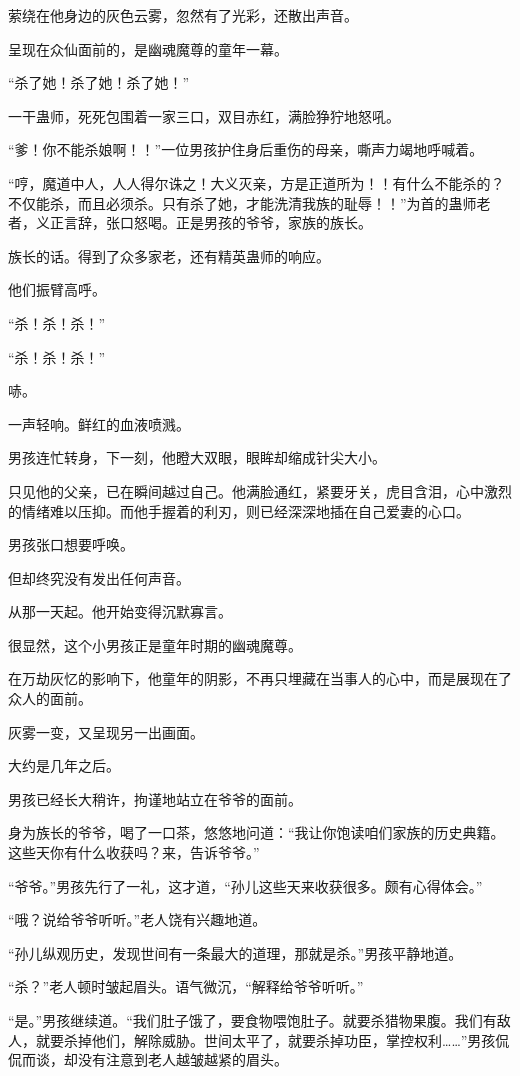 \begin{this_body}
萦绕在他身边的灰色云雾，忽然有了光彩，还散出声音。

呈现在众仙面前的，是幽魂魔尊的童年一幕。

“杀了她！杀了她！杀了她！”

一干蛊师，死死包围着一家三口，双目赤红，满脸狰狞地怒吼。

“爹！你不能杀娘啊！！”一位男孩护住身后重伤的母亲，嘶声力竭地呼喊着。

“哼，魔道中人，人人得尔诛之！大义灭亲，方是正道所为！！有什么不能杀的？不仅能杀，而且必须杀。只有杀了她，才能洗清我族的耻辱！！”为首的蛊师老者，义正言辞，张口怒喝。正是男孩的爷爷，家族的族长。

族长的话。得到了众多家老，还有精英蛊师的响应。

他们振臂高呼。

“杀！杀！杀！”

“杀！杀！杀！”

哧。

一声轻响。鲜红的血液喷溅。

男孩连忙转身，下一刻，他瞪大双眼，眼眸却缩成针尖大小。

只见他的父亲，已在瞬间越过自己。他满脸通红，紧要牙关，虎目含泪，心中激烈的情绪难以压抑。而他手握着的利刃，则已经深深地插在自己爱妻的心口。

男孩张口想要呼唤。

但却终究没有发出任何声音。

从那一天起。他开始变得沉默寡言。

很显然，这个小男孩正是童年时期的幽魂魔尊。

在万劫灰忆的影响下，他童年的阴影，不再只埋藏在当事人的心中，而是展现在了众人的面前。

灰雾一变，又呈现另一出画面。

大约是几年之后。

男孩已经长大稍许，拘谨地站立在爷爷的面前。

身为族长的爷爷，喝了一口茶，悠悠地问道：“我让你饱读咱们家族的历史典籍。这些天你有什么收获吗？来，告诉爷爷。”

“爷爷。”男孩先行了一礼，这才道，“孙儿这些天来收获很多。颇有心得体会。”

“哦？说给爷爷听听。”老人饶有兴趣地道。

“孙儿纵观历史，发现世间有一条最大的道理，那就是杀。”男孩平静地道。

“杀？”老人顿时皱起眉头。语气微沉，“解释给爷爷听听。”

“是。”男孩继续道。“我们肚子饿了，要食物喂饱肚子。就要杀猎物果腹。我们有敌人，就要杀掉他们，解除威胁。世间太平了，就要杀掉功臣，掌控权利……”男孩侃侃而谈，却没有注意到老人越皱越紧的眉头。


\end{this_body}
